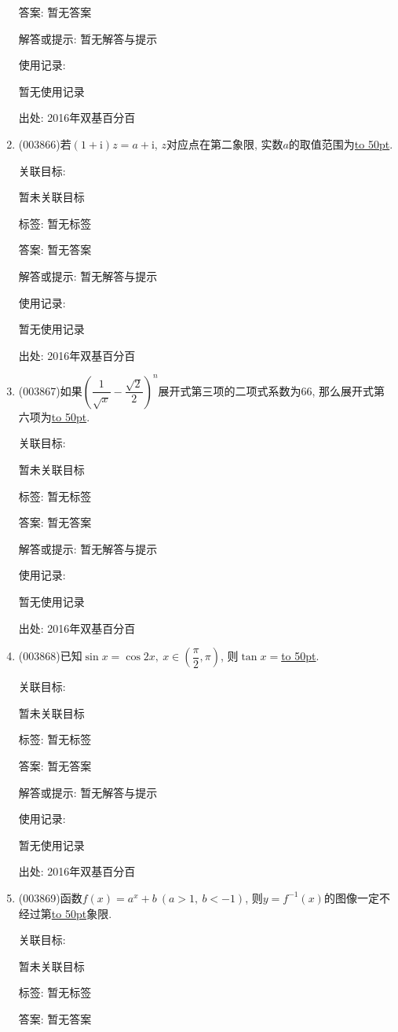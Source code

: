 \documentclass[10pt,a4paper]{article}
\newcommand{\blank}[1]{\underline{\hbox to #1pt{}}}
\begin{document}
\begin{enumerate}[1.]
答案: 暂无答案

解答或提示: 暂无解答与提示

使用记录:

暂无使用记录


出处: 2016年双基百分百
\item { (003866)}若$(1+\mathrm{i})z=a+\mathrm{i}$, $z$对应点在第二象限, 实数$a$的取值范围为\blank{50}.


关联目标:

暂未关联目标



标签: 暂无标签

答案: 暂无答案

解答或提示: 暂无解答与提示

使用记录:

暂无使用记录


出处: 2016年双基百分百
\item { (003867)}如果$\left(\dfrac{1}{\sqrt{x}}-\dfrac{\sqrt{2}}{2}\right)^n$展开式第三项的二项式系数为$66$, 那么展开式第六项为\blank{50}.


关联目标:

暂未关联目标



标签: 暂无标签

答案: 暂无答案

解答或提示: 暂无解答与提示

使用记录:

暂无使用记录


出处: 2016年双基百分百
\item { (003868)}已知$\sin x=\cos 2x, \ x\in\left(\dfrac{\pi}{2},\pi\right)$, 则$\tan x=$\blank{50}.


关联目标:

暂未关联目标



标签: 暂无标签

答案: 暂无答案

解答或提示: 暂无解答与提示

使用记录:

暂无使用记录


出处: 2016年双基百分百
\item { (003869)}函数$f(x)=a^x+b \ (a>1, \ b<-1)$, 则$y=f^{-1}(x)$的图像一定不经过第\blank{50}象限.


关联目标:

暂未关联目标



标签: 暂无标签

答案: 暂无答案


\end{enumerate}
\end{document}
